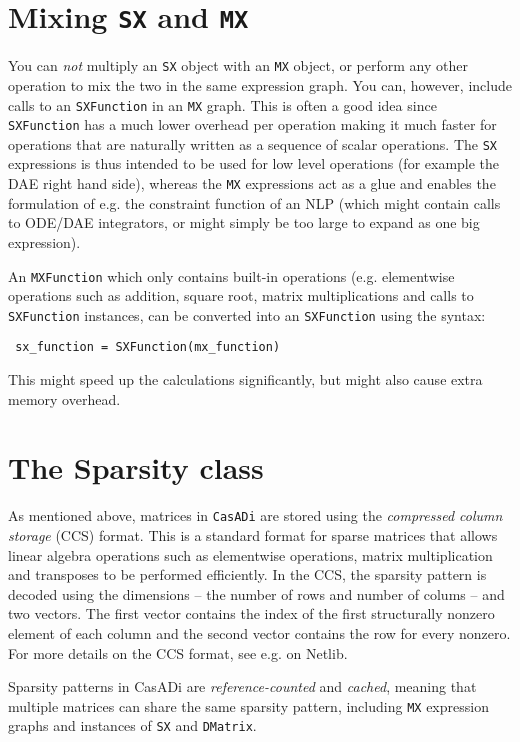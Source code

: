 \documentclass[a4paper,12pt]{book}
\newcommand{\CasADi}{\texttt{CasADi}\xspace}
\begin{document}
\section{Mixing \texttt{SX} and \texttt{MX}}
You can \emph{not} multiply an \texttt{SX} object with an \texttt{MX} object, or perform any other operation to mix the two in the same expression graph. You can, however, include calls to an \texttt{SXFunction} in an \texttt{MX} graph. This is often a good idea since \texttt{SXFunction} has a much lower overhead per operation making it much faster for operations that are naturally written as a sequence of scalar operations. The \texttt{SX} expressions is thus intended to be used for low level operations (for example the DAE right hand side), whereas the \texttt{MX} expressions act as a glue and enables the formulation of e.g. the constraint function of an NLP (which might contain calls to ODE/DAE integrators, or might simply be too large to expand as one big expression).

An \texttt{MXFunction} which only contains built-in operations (e.g. elementwise operations such as addition, square root, matrix multiplications and calls to \texttt{SXFunction} instances, can be converted into an \texttt{SXFunction} using the syntax:
\begin{verbatim}
 sx_function = SXFunction(mx_function)
\end{verbatim}

This might speed up the calculations significantly, but might also cause extra memory overhead.

\section{The Sparsity class}
As mentioned above, matrices in \CasADi are stored using the \emph{compressed column storage} (CCS) format. This is a standard format for sparse matrices that allows linear algebra operations such as elementwise operations, matrix multiplication and transposes to be performed efficiently. In the CCS, the sparsity pattern is decoded using the dimensions -- the number of rows and number of colums -- and two vectors. The first vector contains the index of the first structurally nonzero element of each column and the second vector contains the row for every nonzero. For more details on the CCS format, see e.g.  on Netlib.

Sparsity patterns in CasADi are \emph{reference-counted} and \emph{cached}, meaning that multiple matrices can share the same sparsity pattern, including \texttt{MX} expression graphs and instances of \texttt{SX} and \texttt{DMatrix}.
\end{document}
